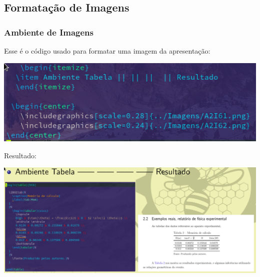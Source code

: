\documentclass{beamer}
\begin{document}
\begin{frame}
  \section{Formatação de  Imagens}
  \frametitle{Ambiente de Imagens}
  \vspace{0.2cm}
  Esse é o código usado para formatar uma imagem da apresentação:
   \begin{center}
   \includegraphics[scale=0.30]{../Imagens/A2I91.png}
 \end{center}
 \vspace{0.2cm}
 Resultado:
 \begin{center}
   \includegraphics[scale=0.23]{../Imagens/A2I92.png}
\end{center}
\end{frame}
\end{document}
